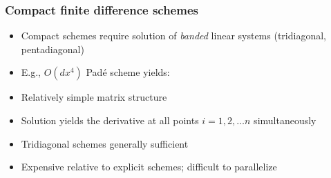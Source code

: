 \begin{frame}[t]
\frametitle{Compact finite difference schemes}
\footnotesize
\begin{itemize}
\item Compact schemes require solution of \emph{banded}
    linear systems (tridiagonal, pentadiagonal)
\item E.g., {$O(dx^4)$ Pad\'{e} scheme yields:
}
\item Relatively simple matrix structure
\item Solution yields the derivative at
    all points $i=1, 2, \hdots n$ simultaneously
\item Tridiagonal schemes generally sufficient
\item Expensive relative to explicit schemes; difficult to parallelize
\end{itemize}
\end{frame}

